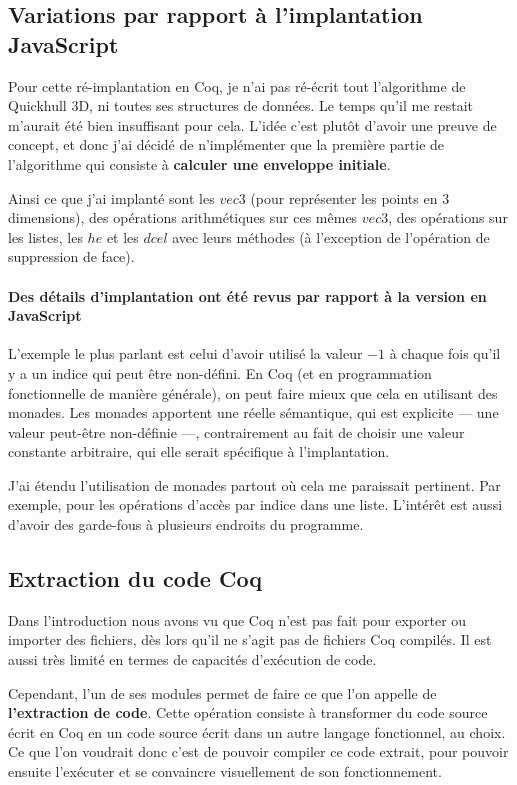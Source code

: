 \documentclass[]{article}
\begin{document}
\subsection{Variations par rapport à l'implantation JavaScript}
Pour cette ré-implantation en Coq, je n'ai pas ré-écrit tout l'algorithme de Quickhull 3D, ni toutes ses structures de données. Le temps qu'il me restait m'aurait été bien insuffisant pour cela. L'idée c'est plutôt d'avoir une preuve de concept, et donc j'ai décidé de n'implémenter que la première partie de l'algorithme qui consiste à \textbf{calculer une enveloppe initiale}.

Ainsi ce que j'ai implanté sont les $vec3$ (pour représenter les points en 3 dimensions), des opérations arithmétiques sur ces mêmes $vec3$, des opérations sur les listes, les $he$ et les $dcel$ avec leurs méthodes (à l'exception de l'opération de suppression de face).

\paragraph{Des détails d'implantation ont été revus par rapport à la version en JavaScript}
L'exemple le plus parlant est celui d'avoir utilisé la valeur $-1$ à chaque fois qu'il y a un indice qui peut être non-défini. En Coq (et en programmation fonctionnelle de manière générale), on peut faire mieux que cela en utilisant des monades. Les monades apportent une réelle sémantique, qui est explicite — une valeur peut-être non-définie —, contrairement au fait de choisir une valeur constante arbitraire, qui elle serait spécifique à l'implantation.

J'ai étendu l'utilisation de monades partout où cela me paraissait pertinent. Par exemple, pour les opérations d'accès par indice dans une liste. L'intérêt est aussi d'avoir des garde-fous à plusieurs endroits du programme.

\subsection{Extraction du code Coq}
Dans l'introduction nous avons vu que Coq n'est pas fait pour exporter ou importer des fichiers, dès lors qu'il ne s'agit pas de fichiers Coq compilés. Il est aussi très limité en termes de capacités d'exécution de code.

Cependant, l'un de ses modules permet de faire ce que l'on appelle de \textbf{l'extraction de code}. Cette opération consiste à transformer du code source écrit en Coq en un code source écrit dans un autre langage fonctionnel, au choix. Ce que l'on voudrait donc c'est de pouvoir compiler ce code extrait, pour pouvoir ensuite l'exécuter et se convaincre visuellement de son fonctionnement.
\end{document}
